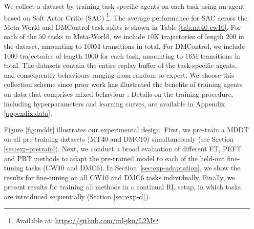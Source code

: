 \documentclass{article}
\begin{document}
We collect a dataset by training task-specific agents on each task using an agent based on Soft Actor Critic (SAC)  \citep{Haarnoja:18}
\footnote{Available at: \url{https://github.com/ml-jku/L2M}}.
The average performance for SAC across the Meta-World and DMControl task splits is shown in Table \ref{tab:mt40-cw10}. 
For each of the $50$ tasks in Meta-World, we include $10$K trajectories of length $200$ in the dataset, amounting to 100M transitions in total. 
For DMControl, we include $1000$ trajectories of length $1000$ for each task, amounting to $16$M transitions in total.
The datasets contain the entire replay buffer of the task-specific agents, and consequently behaviours ranging from random to expert.
We choose this collection scheme since prior work has illustrated the benefits of training agents on data that comprises mixed behaviour \citep{Lee:22}.
Details on the training procedure, including hyperparameters and learning curves, are available in Appendix \ref{appendix:data}.
\begin{table}[h]
\centering
    \caption{Performance measures of task specific SAC-based agents used for data collection averaged over the different task splits. Mean and standard deviation are shown.}
    \hspace{1cm}
    \label{tab:mt40-cw10}
\end{table}

Figure \ref{fig:mddt} illustrates our experimental design.
First, we pre-train a MDDT on all pre-training datasets (MT40 and DMC10) simultaneously (see Section \ref{sec:exp-pretrain}). 
Next, we conduct a broad evaluation of different FT, PEFT and PBT methods to adapt the pre-trained model to each of the held-out fine-tuning tasks (CW10 and DMC6).
In Section~\ref{sec:exp-adaptation}, we show the results for fine-tuning on all CW10 and DMC6 tasks individually.
Finally, we present results for training all methods in a continual RL setup, in which tasks are introduced sequentially (Section \ref{sec:exp-cl}).
\end{document}
